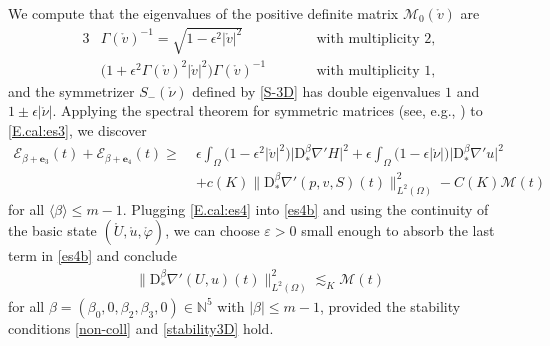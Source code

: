 \documentclass[twoside,11pt]{article}
\numberwithin{equation}{section}
\begin{document}
We compute that the eigenvalues of the positive definite matrix $\mathcal{M}_{0}(\mathring{v})$ are
\begin{alignat*}{3}
	& \varGamma(\mathring{v})^{-1}=\sqrt{1-\epsilon^2|\mathring{v}|^2}\qquad&&\textrm{with multiplicity }2,\\[1mm]
	& \big(1+\epsilon^2 \varGamma(\mathring{v})^2|\mathring{v}|^2 \big)\varGamma(\mathring{v})^{-1}\qquad&&\textrm{with multiplicity }1,
\end{alignat*}
and the symmetrizer $S_{-}(\mathring{\nu})$ defined by \eqref{S-3D} has double eigenvalues
$1$ and $1\pm \epsilon|\mathring{\nu}|$.
Applying the spectral theorem for symmetric matrices (see, e.g., \cite[Theorem 8.6.10]{A91MR1129886}) to \eqref{E.cal:es3}, we discover
\begin{align}
 		\mathcal{E}_{\beta+\mathbf{e}_3}(t)+
	\mathcal{E}_{\beta+\mathbf{e}_4}(t)
	\geq \; &	\epsilon \int_{\Omega} \big(1-\epsilon^2|\mathring{v}|^2\big)\big|\mathrm{D}_*^{\beta}\nabla' H\big|^2
	+ \epsilon \int_{\Omega} \big(1-\epsilon|\mathring{\nu}|\big) \big|\mathrm{D}_*^{\beta}\nabla'u\big|^2
	\nonumber \\[1mm]
&
	+ c(K)\big\|\mathrm{D}_*^{\beta}\nabla'(p,v,S)(t)\big\|^2_{L^2(\Omega)}
	-C(K)\mathcal{M}(t)
	\label{E.cal:es4}
\end{align}
for all $\langle\beta\rangle\leq m-1$.
Plugging \eqref{E.cal:es4}  into  \eqref{es4b}
and using the continuity of the basic state $(\mathring{U},\mathring{u},\mathring{\varphi})$,
we can choose $\varepsilon>0$ small enough to absorb the last term in \eqref{es4b} and conclude
\begin{align}
	\big\|\mathrm{D}_*^{\beta}\nabla'(U,u)(t)\big\|_{L^2(\Omega)}^2
	\lesssim_{K} \mathcal{M}(t)
	\label{es5}
\end{align}
for all $\beta=(\beta_0,0,\beta_2, \beta_3,0)\in\mathbb{N}^5$ with $|\beta|\leq m-1$,
provided the stability conditions \eqref{non-coll} and \eqref{stability3D} hold.











\end{document}
